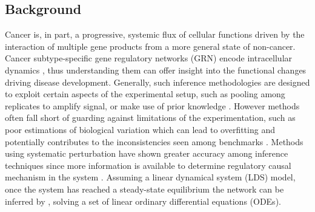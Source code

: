 \documentclass[a0,portrait]{a0poster}
\begin{document}
\begin{multicols}{2}
\section*{Background}
Cancer is, in part, a progressive, systemic flux of cellular functions driven by the interaction of multiple gene products \cite{subramanian2017next}\cite{barabasi2011network} from a more general state of non-cancer. Cancer subtype-specific gene regulatory networks (GRN) encode intracellular dynamics \cite{tarca2006analysis}, thus understanding them can offer insight into the functional changes driving disease development. %
Generally, such inference methodologies are designed to exploit certain aspects of the experimental setup, such as pooling among replicates to amplify signal, or make use of prior knowledge \cite{haury2012tigress} \cite{mordelet2008sirene}. However methods often fall short of guarding against limitations of the experimentation, such as poor estimations of biological variation which can lead to overfitting and potentially contributes to the inconsistencies seen among benchmarks \cite{guo2016gene}. Methods using systematic perturbation have shown greater accuracy among inference techniques since more information is available to determine regulatory causal mechanism in the system \cite{minnier2011perturbation}. %
Assuming a linear dynamical system (LDS) \cite{gardner2003inferring} model, once the system has reached a steady-state equilibrium the network can be inferred  by , solving a set of  linear ordinary differential equations (ODEs). 





\end{multicols}
\end{document}
